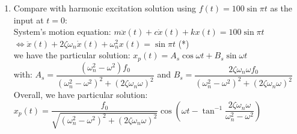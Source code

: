 \documentclass[14pt,a4paper]{article}
\begin{document}
\begin{enumerate}
	\label{Problem 2 - Harmonic}
	\item Compare with harmonic excitation solution using $f(t) = 100\sin \pi t$ as the input at $t =0$:\\
	System's motion equation: $m\ddot{x}(t) + c\dot{x}(t) + kx(t) = 100\sin\pi t$ \\
	\hspace*{3.7cm} $\Leftrightarrow \ddot{x}(t) + 2 \zeta \omega_n \dot{x}(t) + \omega_n^2x(t) = \sin \pi t$ \hspace{1cm} (*)\\
	we have the particular solution: $x_p(t) = A_s\cos\omega t + B_s\sin\omega t$\\
	with: $A_s = \dfrac{(\omega_n^2 - \omega^2)f_0}{(\omega_n^2 - \omega^2)^2 + (2\zeta\omega_n\omega)^2}$ \hspace{1cm} and \hspace{0.5cm} $B_s = \dfrac{2\zeta\omega_n\omega f_0}{(\omega_n^2 - \omega^2)^2 + (2\zeta\omega_n\omega)^2}$\\
	Overall, we have particular solution:\\
	\hspace*{2cm} $x_p(t) = \dfrac{f_0}{\sqrt{(\omega_n^2 - \omega^2)^2 + (2\zeta\omega_n\omega)^2}} \cos\left( \omega t - \tan^{-1}\dfrac{2\zeta\omega_n\omega}{\omega_n^2 - \omega^2} \right)$
	

\end{enumerate}
\end{document}
